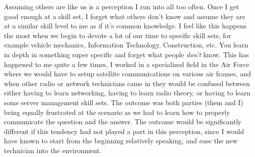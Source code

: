 \documentclass[12pt]{article}
\begin{document}
\par
Assuming others are like us is a perception I run into all too often. Once I get good enough at a skill set, I forget what others don't know and assume they are at a similar skill level to me as if it's common knowledge. I feel like this happens the most when we begin to devote a lot of our time to specific skill sets, for example vehicle mechanics, Information Technology, Construction, etc. You learn in depth in something super specific and forget what people \emph{don't} know. This has happened to me quite a few times, I worked in a specialized field in the Air Force where we would have to setup satellite communications on various air frames, and when other radio or network technicians came in they would be confused between either having to learn networking, having to learn radio theory, or having to learn some server management skill sets. The outcome was both parties (them and I) being equally frustrated at the scenario as we had to learn how to properly communicate the question and the answer. The outcome would be significantly different if this tendency had not played a part in this perception, since I would have known to start from the beginning relatively speaking, and ease the new technician into the environment.
\end{document}
